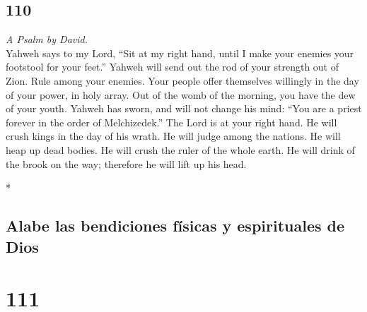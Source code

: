 \begin{paracol}{2}
\switchcolumn
\begin{otherlanguage}{english}

\hypertarget{section-219}{%
\section{110}\label{section-219}}

\emph{A Psalm by David.}\\
 Yahweh says to my Lord, ``Sit at my right hand, until I
make your enemies your footstool for your feet.''  Yahweh
will send out the rod of your strength out of Zion. Rule among your
enemies.  Your people offer themselves willingly in the
day of your power, in holy array. Out of the womb of the morning, you
have the dew of your youth.  Yahweh has sworn, and will
not change his mind: ``You are a priest forever in the order of
Melchizedek.''  The Lord is at your right hand. He will
crush kings in the day of his wrath.  He will judge among
the nations. He will heap up dead bodies. He will crush the ruler of the
whole earth.  He will drink of the brook on the way;
therefore he will lift up his head.

\end{otherlanguage}

\switchcolumn[0]*

\hypertarget{alabe-las-bendiciones-fuxedsicas-y-espirituales-de-dios}{%
\subsection{Alabe las bendiciones físicas y espirituales de
Dios}\label{alabe-las-bendiciones-fuxedsicas-y-espirituales-de-dios}}

\hypertarget{section-220}{%
\section{111}\label{section-220}}


\end{paracol}
